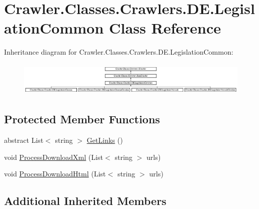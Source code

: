 \hypertarget{class_crawler_1_1_classes_1_1_crawlers_1_1_d_e_1_1_legislation_common}{\section{Crawler.\-Classes.\-Crawlers.\-D\-E.\-Legislation\-Common Class Reference}
\label{class_crawler_1_1_classes_1_1_crawlers_1_1_d_e_1_1_legislation_common}
}
Inheritance diagram for Crawler.\-Classes.\-Crawlers.\-D\-E.\-Legislation\-Common\-:\begin{figure}[H]
\begin{center}
\leavevmode
\includegraphics[height=1.623188cm]{class_crawler_1_1_classes_1_1_crawlers_1_1_d_e_1_1_legislation_common}
\end{center}
\end{figure}
\subsection*{Protected Member Functions}
\begin{DoxyCompactItemize}
\item 
abstract List$<$ string $>$ \hyperlink{class_crawler_1_1_classes_1_1_crawlers_1_1_d_e_1_1_legislation_common_a4790e6510d8f334d259ce86f56ee9136}{Get\-Links} ()
\item 
void \hyperlink{class_crawler_1_1_classes_1_1_crawlers_1_1_d_e_1_1_legislation_common_acbf2b7c65c8ff1f0fa8d312ebd310913}{Process\-Download\-Xml} (List$<$ string $>$ urls)
\item 
void \hyperlink{class_crawler_1_1_classes_1_1_crawlers_1_1_d_e_1_1_legislation_common_a519dbefe4243f3c820ad41f116d1f66c}{Process\-Download\-Html} (List$<$ string $>$ urls)
\end{DoxyCompactItemize}
\subsection*{Additional Inherited Members}


